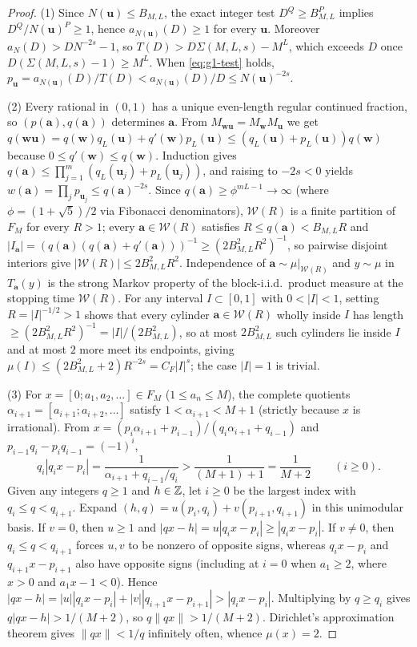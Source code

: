 \documentclass[11pt]{article}
\newcommand{\dist}[1]{\lVert #1\rVert}
\begin{document}
\begin{proof}
(1) Since $N(\mathbf{u})\le B_{M,L}$, the exact integer test $D^Q\ge B_{M,L}^P$ implies $D^Q/N(\mathbf{u})^P\ge1$, hence $a_{N(\mathbf{u})}(D)\ge1$ for every $\mathbf{u}$. Moreover $a_N(D)>DN^{-2s}-1$, so $T(D)>D\Sigma(M,L,s)-M^L$, which exceeds $D$ once $D(\Sigma(M,L,s)-1)\ge M^L$. When \eqref{eq:g1-test} holds, $p_{\mathbf{u}}=a_{N(\mathbf{u})}(D)/T(D)<a_{N(\mathbf{u})}(D)/D\le N(\mathbf{u})^{-2s}$.

(2) Every rational in $(0,1)$ has a unique even-length regular continued fraction, so $(p(\mathbf{a}),q(\mathbf{a}))$ determines $\mathbf{a}$. From $M_{\mathbf{w}\mathbf{u}}=M_{\mathbf{w}}M_{\mathbf{u}}$ we get $q(\mathbf{w}\mathbf{u})=q(\mathbf{w})q_L(\mathbf{u})+q'(\mathbf{w})p_L(\mathbf{u})\le(q_L(\mathbf{u})+p_L(\mathbf{u}))q(\mathbf{w})$ because $0\le q'(\mathbf{w})\le q(\mathbf{w})$. Induction gives $q(\mathbf{a})\le\prod_{j=1}^m(q_L(\mathbf{u}_j)+p_L(\mathbf{u}_j))$, and raising to $-2s<0$ yields $w(\mathbf{a})=\prod_j p_{\mathbf{u}_j}\le q(\mathbf{a})^{-2s}$. Since $q(\mathbf{a})\ge\phi^{mL-1}\to\infty$ (where $\phi=(1+\sqrt5)/2$ via Fibonacci denominators), $\mathcal{W}(R)$ is a finite partition of $F_M$ for every $R>1$; every $\mathbf{a}\in\mathcal{W}(R)$ satisfies $R\le q(\mathbf{a})<B_{M,L}R$ and $|I_{\mathbf{a}}|=(q(\mathbf{a})(q(\mathbf{a})+q'(\mathbf{a})))^{-1}\ge(2B_{M,L}^2R^2)^{-1}$, so pairwise disjoint interiors give $|\mathcal{W}(R)|\le 2B_{M,L}^2R^2$. Independence of $\mathbf{a}\sim\mu|_{\mathcal{W}(R)}$ and $y\sim\mu$ in $T_{\mathbf{a}}(y)$ is the strong Markov property of the block-i.i.d.\ product measure at the stopping time $\mathcal{W}(R)$. For any interval $I\subset[0,1]$ with $0<|I|<1$, setting $R=|I|^{-1/2}>1$ shows that every cylinder $\mathbf{a}\in\mathcal{W}(R)$ wholly inside $I$ has length $\ge(2B_{M,L}^2R^2)^{-1}=|I|/(2B_{M,L}^2)$, so at most $2B_{M,L}^2$ such cylinders lie inside $I$ and at most $2$ more meet its endpoints, giving $\mu(I)\le(2B_{M,L}^2+2)R^{-2s}=C_F|I|^s$; the case $|I|=1$ is trivial.

(3) For $x=[0;a_1,a_2,\dots]\in F_M$ ($1\le a_n\le M$), the complete quotients $\alpha_{i+1}=[a_{i+1};a_{i+2},\dots]$ satisfy $1<\alpha_{i+1}<M+1$ (strictly because $x$ is irrational). From $x=(p_i\alpha_{i+1}+p_{i-1})/(q_i\alpha_{i+1}+q_{i-1})$ and $p_{i-1}q_i-p_iq_{i-1}=(-1)^i$,
\[
q_i|q_ix-p_i|=\frac1{\alpha_{i+1}+q_{i-1}/q_i}>\frac1{(M+1)+1}=\frac1{M+2}\qquad(i\ge0).
\]
Given any integers $q\ge1$ and $h\in\mathbb Z$, let $i\ge0$ be the largest index with $q_i\le q<q_{i+1}$. Expand $(h,q)=u(p_i,q_i)+v(p_{i+1},q_{i+1})$ in this unimodular basis. If $v=0$, then $u\ge1$ and $|qx-h|=u|q_ix-p_i|\ge|q_ix-p_i|$. If $v\ne0$, then $q_i\le q<q_{i+1}$ forces $u,v$ to be nonzero of opposite signs, whereas $q_ix-p_i$ and $q_{i+1}x-p_{i+1}$ also have opposite signs (including at $i=0$ when $a_1\ge2$, where $x>0$ and $a_1x-1<0$). Hence $|qx-h|=|u||q_ix-p_i|+|v||q_{i+1}x-p_{i+1}|>|q_ix-p_i|$. Multiplying by $q\ge q_i$ gives $q|qx-h|>1/(M+2)$, so $q\dist{qx}>1/(M+2)$. Dirichlet's approximation theorem gives $\dist{qx}<1/q$ infinitely often, whence $\mu(x)=2$.
\end{proof}
\end{document}
